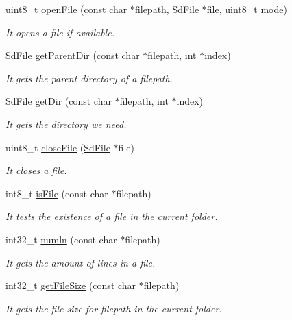 \begin{DoxyCompactItemize}
uint8\+\_\+t \hyperlink{class_wasp_s_d_aa0e399c0aeeb29eff9a37a7c303796a4}{open\+File} (const char $\ast$filepath, \hyperlink{class_sd_file}{Sd\+File} $\ast$file, uint8\+\_\+t mode)
\begin{DoxyCompactList}\small\item\em It opens a file if available. \end{DoxyCompactList}\item 
\hyperlink{class_sd_file}{Sd\+File} \hyperlink{class_wasp_s_d_a94b8d2ef4aa4bb5c496e235b39b94145}{get\+Parent\+Dir} (const char $\ast$filepath, int $\ast$index)
\begin{DoxyCompactList}\small\item\em It gets the parent directory of a filepath. \end{DoxyCompactList}\item 
\hyperlink{class_sd_file}{Sd\+File} \hyperlink{class_wasp_s_d_aaad4cebc4f5f21a6e49c9600d5c21da1}{get\+Dir} (const char $\ast$filepath, int $\ast$index)
\begin{DoxyCompactList}\small\item\em It gets the directory we need. \end{DoxyCompactList}\item 
uint8\+\_\+t \hyperlink{class_wasp_s_d_a440aa7967f29fefc8a89f25256692b18}{close\+File} (\hyperlink{class_sd_file}{Sd\+File} $\ast$file)
\begin{DoxyCompactList}\small\item\em It closes a file. \end{DoxyCompactList}\item 
int8\+\_\+t \hyperlink{class_wasp_s_d_a78620ce2e7ab96c8665c6c5309716dc5}{is\+File} (const char $\ast$filepath)
\begin{DoxyCompactList}\small\item\em It tests the existence of a file in the current folder. \end{DoxyCompactList}\item 
int32\+\_\+t \hyperlink{class_wasp_s_d_ada0f343921cc1b68ce1662b6f8b4d2f0}{numln} (const char $\ast$filepath)
\begin{DoxyCompactList}\small\item\em It gets the amount of lines in a file. \end{DoxyCompactList}\item 
int32\+\_\+t \hyperlink{class_wasp_s_d_a2a46bde220e6dca44babed44c884a65f}{get\+File\+Size} (const char $\ast$filepath)
\begin{DoxyCompactList}\small\item\em It gets the file size for filepath in the current folder. \end{DoxyCompactList}\item 

\end{DoxyCompactItemize}

